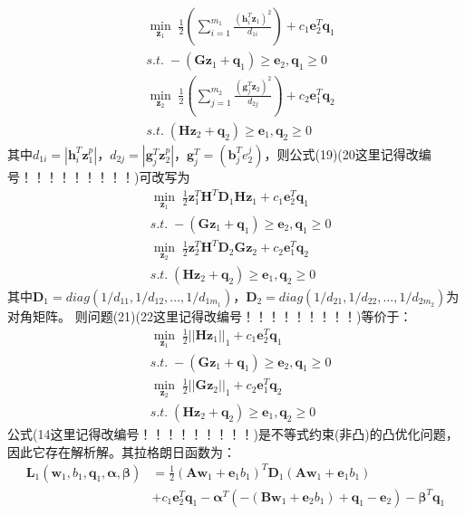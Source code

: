 \documentclass{article}
\theoremstyle{definition}
\theoremstyle{definition}
\theoremstyle{remark}
\begin{document}
\begin{align}
&\min\limits_{\mathbf{z}_1} \; \frac{1}{2}(\sum_{i=1}^{m_1}\frac{(\mathbf{h}_i^T\mathbf{z}_1)^2}{d_{1i}})+c_1\mathbf{e}_2^T\mathbf{q}_1 \nonumber \\
&s.t.\; -(\mathbf{Gz}_1+\mathbf{q}_1) \geq \mathbf{e}_2,\mathbf{q}_1\geq 0\\
&\min\limits_{\mathbf{z}_2} \; \frac{1}{2}(\sum_{j=1}^{m_2}\frac{(\mathbf{g}_j^T\mathbf{z}_2)^2}{d_{2j}})+c_2\mathbf{e}_1^T\mathbf{q}_2 \nonumber \\
&s.t. \; (\mathbf{Hz}_2+\mathbf{q}_2)\geq \mathbf{e}_1, \mathbf{q}_2\geq 0
\end{align}
其中$d_{1i}=|\mathbf{h}_i^T\mathbf{z}_1^p|$，$d_{2j}=|\mathbf{g}_j^T\mathbf{z}_2^p|$，$\mathbf{g}_j^T=(\mathbf{b}_j^Te_2^j)$，则公式(19)(20这里记得改编号！！！！！！！！！)可改写为
\begin{align}
&\min\limits_{\mathbf{z}_1} \; \frac{1}{2}\mathbf{z}_1^T\mathbf{H}^T\mathbf{D}_1\mathbf{Hz}_1+c_1\mathbf{e}_2^T\mathbf{q}_1\nonumber\\
&s.t.\; -(\mathbf{Gz}_1+\mathbf{q}_1) \geq \mathbf{e}_2,\mathbf{q}_1\geq 0\\
&\min\limits_{\mathbf{z}_2} \; \frac{1}{2}\mathbf{z}_2^T\mathbf{H}^T\mathbf{D}_2\mathbf{Gz}_2+c_2\mathbf{e}_1^T\mathbf{q}_2\nonumber\\
&s.t. \; (\mathbf{Hz}_2+\mathbf{q}_2)\geq \mathbf{e}_1, \mathbf{q}_2\geq 0
\end{align}
其中$\mathbf{D}_1=diag(1/d_{11},1/d_{12},…,1/d_{1m_1})，\mathbf{D}_2=diag(1/d_{21},1/d_{22},…,1/d_{2m_2})$为对角矩阵。
则问题(21)(22这里记得改编号！！！！！！！！！)等价于：
\begin{align}
&\min\limits_{\mathbf{z}_1} \; \frac{1}{2}||\mathbf{Hz}_1||_1+c_1\mathbf{e}_2^T\mathbf{q}_1\nonumber\\
&s.t.\; -(\mathbf{Gz}_1+\mathbf{q}_1) \geq \mathbf{e}_2,\mathbf{q}_1\geq 0\\
&\min\limits_{\mathbf{z}_2} \; \frac{1}{2}||\mathbf{Gz}_2||_1+c_2\mathbf{e}_1^T\mathbf{q}_2\nonumber\\
&s.t. \; (\mathbf{Hz}_2+\mathbf{q}_2)\geq \mathbf{e}_1, \mathbf{q}_2\geq 0
\end{align}
公式(14这里记得改编号！！！！！！！！！)是不等式约束(非凸)的凸优化问题，因此它存在解析解。其拉格朗日函数为：
\begin{align}
\pmb{L}_1(\mathbf{w}_1,b_1,\mathbf{q}_1,\pmb{\alpha},\pmb{\beta}) &=\frac{1}{2}(\mathbf{Aw}_1+\mathbf{e}_1b_1)^T\mathbf{D}_1(\mathbf{Aw}_1+\mathbf{e}_1b_1)\nonumber\\
&+c_1\mathbf{e}_2^T\mathbf{q}_1-\pmb{\alpha}^T(-(\mathbf{Bw}_1+\mathbf{e}_2b_1)+\mathbf{q}_1-\mathbf{e}_2)-\pmb{\beta}^T\mathbf{q}_1
\end{align}
\end{document}
